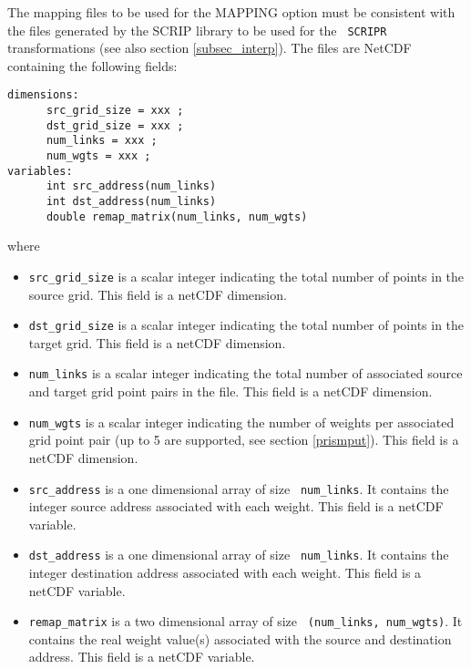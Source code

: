 The mapping files to be used for the MAPPING option must be consistent
with the files generated by the SCRIP library to be used for the {\tt
  SCRIPR} transformations (see also section \ref{subsec_interp}). The
files are NetCDF containing the following fields:
\begin{verbatim}
dimensions:
      src_grid_size = xxx ;
      dst_grid_size = xxx ;
      num_links = xxx ;
      num_wgts = xxx ;
variables:
      int src_address(num_links) 
      int dst_address(num_links) 
      double remap_matrix(num_links, num_wgts) 
\end{verbatim}
where
\begin{itemize}
\item {\tt src\_grid\_size} is a scalar integer indicating the total number
  of points in the source grid.  
  This field is a netCDF dimension.
\item {\tt dst\_grid\_size} is a scalar integer indicating the total number
  of points in the target grid.  
  This field is a netCDF dimension.
\item {\tt num\_links} is a scalar integer indicating the total number
  of associated source and target grid point pairs in the file.  This field is a netCDF dimension.
\item {\tt num\_wgts} is a scalar integer indicating the number of
  weights per associated grid point pair (up to 5 are supported, see
  section \ref{prismput}).  This field is a netCDF dimension.
\item {\tt src\_address} is a one dimensional array of size {\tt
    num\_links}.  It contains the integer source address associated
  with each weight.  This field is a netCDF variable.
\item {\tt dst\_address} is a one dimensional array of size {\tt
    num\_links}.  It contains the integer destination address
  associated with each weight.  This field is a netCDF variable.
\item {\tt remap\_matrix} is a two dimensional array of size {\tt
    (num\_links, num\_wgts)}.  It contains the real weight value(s)
  associated with the source and destination address.  This field is a
  netCDF variable.
\end{itemize}
